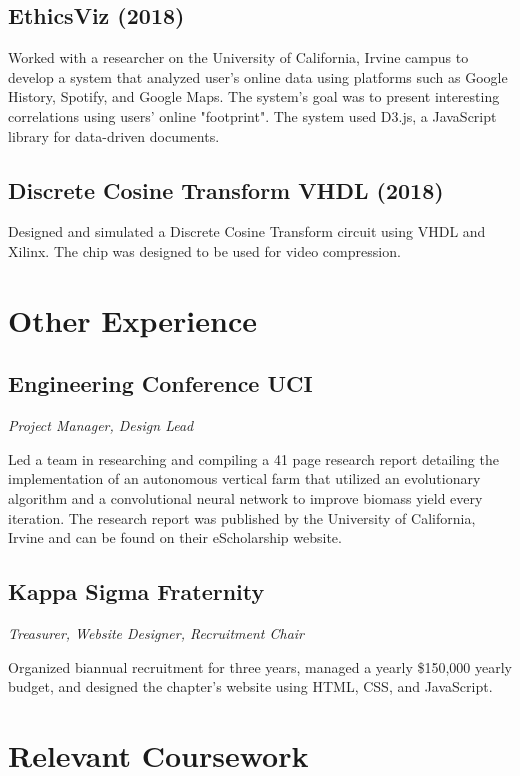 \documentclass{article}
\begin{document}
\subsection{EthicsViz (2018)}

Worked with a researcher on the University of California, Irvine campus to develop a system that analyzed 
user's online data using platforms such as Google History, Spotify, and Google Maps. The system's goal was to present interesting correlations using users' online "footprint".  The system used D3.js, a JavaScript library for data-driven documents. 

\subsection{Discrete Cosine Transform VHDL (2018)}

Designed and simulated a Discrete Cosine Transform circuit using VHDL and Xilinx. The chip was designed to be 
used for video compression. 

\section{Other Experience}

\subsection{Engineering Conference UCI}

\noindent\textit{Project Manager, Design Lead}

Led a team in researching and compiling a 41 page research report detailing the implementation of an 
autonomous vertical farm that utilized an evolutionary algorithm and a convolutional neural network 
to improve biomass yield every iteration. The research report was published by the University of 
California, Irvine and can be found on their eScholarship website.

\subsection{Kappa Sigma Fraternity}

\noindent\textit{Treasurer, Website Designer, Recruitment Chair}

Organized biannual recruitment for three years, managed a yearly \$150,000 yearly budget, and designed 
the chapter's website using HTML, CSS, and JavaScript.

\section{Relevant Coursework}
\end{document}
